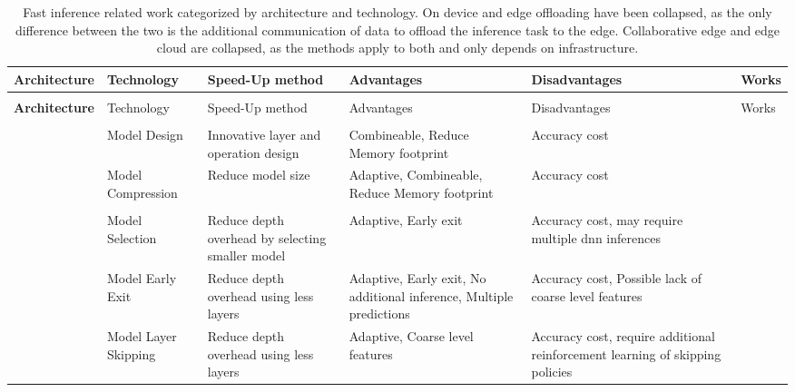 \begin{minipage}[t]{\linewidth}
\begin{tiny}
\begin{longtabu}{>{\bfseries}X[0.8c]|X[c]|X[c]|X[c]|X[c]|X[c]}
	\caption[Fast Inference Related Work]{Fast inference related work categorized by architecture and technology. On device and edge offloading have been collapsed, as the only difference between the two is the additional communication of data to offload the inference task to the edge. Collaborative edge and edge cloud are collapsed, as the methods apply to both and only depends on infrastructure.} \label{tbl:fast-inference} \\
	\toprule
	\rowfont{\bfseries}
	Architecture & Technology & Speed-Up method & Advantages & Disadvantages & Works \tabularnewline
	\hline
	\endfirsthead
	\\
	\toprule
	\rowfont{\bfseries}
	Architecture & Technology & Speed-Up method & Advantages & Disadvantages & Works \tabularnewline
	\hline
	\endhead %
	\hline
	\\
	\endfoot
	\hline
	\endlastfoot
	  & Model Design & Innovative layer and operation design & Combineable, Reduce Memory footprint  & Accuracy cost & \cite{iandola_squeezenet:_2016,howard_mobilenets:_2017,sandler_mobilenetv2:_2018, zhang_shufflenet:_2017, ma_shufflenet_2018} \tabularnewline
	
	& Model Compression & Reduce model size & Adaptive, Combineable, Reduce Memory footprint & Accuracy cost &  \cite{hinton_distilling_2015,courbariaux_binaryconnect:_2015,courbariaux_binarized_2016,romero_fitnets:_2014} \tabularnewline	
	& & & & & \tabularnewline
	
	& Model Selection & Reduce depth overhead by selecting smaller model & Adaptive, Early exit & Accuracy cost, may require multiple \gls{dnn} inferences & \cite{bolukbasi_adaptive_2017, tann_flexible_2018, park_big/little_2015} \tabularnewline
	
	& Model Early Exit & Reduce depth overhead using less layers & Adaptive, Early exit, No additional inference, Multiple predictions & Accuracy cost, Possible lack of coarse level features & \cite{leroux_resource-constrained_2015,teerapittayanon_branchynet:_2016, berestizshevsky_sacrificing_2019, kaya_shallow-deep_nodate, huang_multi-scale_2017} \tabularnewline
	& Model Layer Skipping & Reduce depth overhead using less layers & Adaptive, Coarse level features & Accuracy cost, require additional reinforcement learning of skipping policies & \cite{wang_skipnet:_2017,wu_blockdrop:_2017} \tabularnewline\hline
		

\end{longtabu}
\end{tiny}
\end{minipage}
